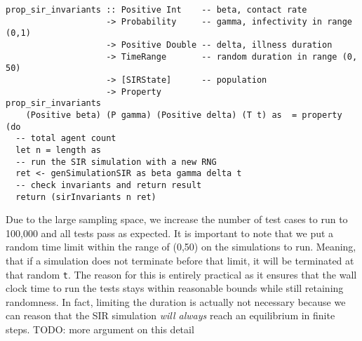 \begin{footnotesize}
\begin{verbatim}
prop_sir_invariants :: Positive Int    -- beta, contact rate
                    -> Probability     -- gamma, infectivity in range (0,1)
                    -> Positive Double -- delta, illness duration
                    -> TimeRange       -- random duration in range (0, 50)
                    -> [SIRState]      -- population
                    -> Property
prop_sir_invariants 
    (Positive beta) (P gamma) (Positive delta) (T t) as  = property (do
  -- total agent count
  let n = length as
  -- run the SIR simulation with a new RNG 
  ret <- genSimulationSIR as beta gamma delta t
  -- check invariants and return result
  return (sirInvariants n ret)
\end{verbatim}
\end{footnotesize}

Due to the large sampling space, we increase the number of test cases to run to 100,000 and all tests pass as expected. It is important to note that we put a random time limit within the range of (0,50) on the simulations to run. Meaning, that if a simulation does not terminate before that limit, it will be terminated at that random \texttt{t}. The reason for this is entirely practical as it ensures that the wall clock time to run the tests stays within reasonable bounds while still retaining randomness. In fact, limiting the duration is actually not necessary because we can reason that the SIR simulation \textit{will always} reach an equilibrium in finite steps. TODO: more argument on this detail
